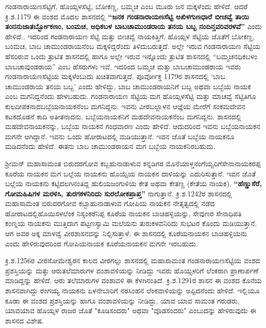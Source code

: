 ಗಂಡನಾರಾಯಣಸೆಟ್ಟಿಗೆ, ಹೊಯ್ಸಳಸೆಟ್ಟಿ, ಬೋಕಣ್ಣ, ಬಮ್ಮಚ ಎಂಬ ಮೂರು ಜನ ಮಕ್ಕಳೆಂದು ಹೇಳಿದೆ. ಆದರೆ ಕ್ರಿ.ಶ.1179 ಈ ವಂಶದ ಮೊದಲ ಶಾಸನದಲ್ಲಿ \textbf{“ಜನಕ ಗಂಡನಾರಾಯಣಸೆಟ್ಟಿ ಅಖಿಳಗುಣಧಾರೆ ಬೀಚವ್ವೆ ತಾಯಿ\general{\break } ತಂನನುಜಾತರ್ಬ್ಬೋಕಣಂ, ಬಂಮಚ, ಅಧಿಕಬಳ ಬಾಬಚಾಮುಂಡರಾಯ ತನಯ ಬಬ್ಬ ನಂದಿನ್ತವರಿವರಳವೆ” }ಎಂದು ಹೇಳಿದೆ.. ಇದರಿಂದ ಗಂಡನಾರಾಯಣ ಸೆಟ್ಟಿ ಮತ್ತು ಬೀಚವ್ವೆ ನಾಯಕಿತ್ತಿಗೆ, ಹೊಯ್ಸಳ ಸೆಟ್ಟಿಯ ಜೊತೆಗೆ ಬೋಕಣ್ಣ, ಬಂಮಚ, ಬಾಬ ಚಾಮುಂಡರಾಯನೆಂಬ ಮಕ್ಕಳಿದ್ದರೆಂದು ತಿಳಿದುಬರುತ್ತದೆ. ಅಲ್ಲೇ ಇರುವ ಗಂಡನಾರಾಯಣ ಸೆಟ್ಟಿಯ ಹೆಸರಿರುವ ಒಂದು ತ್ರುಟಿತ ಶಾಸನದಲ್ಲಿ ಹಾಗೂ ಅಲ್ಲೇ ಇರುವ ಇನ್ನೊಂದು ತ್ರುಟಿತ ಶಾಸನದಲ್ಲಿ “ಬಮ್ಮಚನಧಿಕಬಳಂ ಬಾಬಚಾವುಂಡರಾಯ” ಎಂಬ ಹೆಸರುಗಳು ಇವೆ. ಇದರಿಂದ ಬಮ್ಮಚ ಮತ್ತು ಬಾಬಚಾಮುಂಡರಾಯ ಇವರು ಗಂಡನಾರಾಯಣಸೆಟ್ಟಿಯ ಮಕ್ಕಳೆಂಬುದು ಖಚಿತವಾಗುತ್ತದೆ. ಪೂರ್ವೋಕ್ತ 1179ರ ಶಾಸನದಲ್ಲಿ ‘ಬಾಬ ಚಾಮುಂಡರಾಯ ತನಯ ಬಬ್ಬ’ ಎಂದು ಹೇಳಿದ್ದು, ಬಾಬ ಚಾಮುಂಡರಾಯನಿಗೆ ಬಬ್ಬ ಅಥವಾ ಬಬ್ಬೆಯ ನಾಯಕ ಎಂಬ ಮಗನಿದ್ದನೆಂದು ಹೇಳಬಹುದು. ಗಂಡನಾರಾಯಣ ಸೆಟ್ಟಿಯ ಮಗ ಹೊಯ್ಸಳಸೆಟ್ಟಿ ಮತ್ತು ಮಾಚವ್ವೆ ಸೆಟ್ಟಿತಿಗೂ ಕುಲದೀಪಕನಾದ\break ಬಬ್ಬೆಯನಾಯಕನೆಂಬ ಮಗನಿದ್ದನು. ಇವನು ವೀರಬಲ್ಲಾಳನ ಆಜ್ಞೆಯ ಮೇರೆಗೆ ಸಂಕಮದೇವನ ಕಟಕದೊಡನೆ ಕಾದಿ ಅತೀತನಾದನು. ಬಬ್ಬೆಯನಾಯಕನಿಗೆ ಮಹದೇವನಾಯಕನೆಂಬ ಮಗನಿದ್ದನು. ಶಾಸನದಲ್ಲಿ ಮಹದೇವನಾಯಕನನ್ನು, ಬಬ್ಬೆಯ ನಾಯಕನ ಗಂಧವಾರಣ ಎಂದು ಹೇಳಿದೆ. ಆದುದರಿಂದ ಇವನು ಬಬ್ಬೆಯನಾಯಕನ ಮಗನೇ ಆಗಿದ್ದಾನೆ. ಇವನು ಒಂದು ಹೋರಾಟದಲ್ಲಿ ಮಡಿಯುತ್ತಾನೆ. ಇವನ ಜೊತೆ ಬಬ್ಬೆಯ ನಾಯಕನೂ ಮಡಿದನೆಂದು ಹೇಳಿದೆ. ಈತನು ಬಾಬ ಚಾಮುಂಡರಾಯನ ಮಗ ಬಬ್ಬೆಯ ನಾಯಕನಿರಬಹುದು.

ಶ‍್ರೀಮನ್​ ಮಹಾಸಾಮಂತ ಬಿರುದರಗೋವ ಕಬ್ಬಹುನಾಡಾಳುವ ಕನ್ನಡಿಗರ ಮೊನೆಯಾಳ್ತನಂಗೆಯ್ವರಿಗೆ\break ಸೇನಾನಾಯಕರಪ್ಪ ಕೂರೆಯ ನಾಯಕನ ಮಗ ಬಲ್ಲೆಯ ನಾಯಕನು ಹೊಯ್ಸೆಯ ನಾಯಕನ ದಾಳಿಯನ್ನು ಎದುರಿಸುತ್ತಾನೆ. ಇವನ ಜೊತೆ ಬಲ್ಲೆಯ ನಾಯಕನು ಕಟ್ಟಿದಲಗಿನಂತಿದ್ದ ಹುಲಿಯಜಂಗುಳಿಯ ಕೇತ ಅಥವಾ ಕೇತಣ್ಣ (ಕೇತೆಯ ನಾಯಕ), \textbf{“ಹೆಣ್ಣುಸೆರೆ, ಗೋಮಹಿಷಿಗಳ ಮರಳಿಸಿ, ತುರಗಕಳನಿರಿದು ಸುರಲೋಕಪ್ರಾಪ್ತ”} ನಾಗುತ್ತಾನೆ. ಕ್ರಿ.ಶ.1242ರ ಶಾಸನದಲ್ಲಿ ಮಹಾಸಾಮಂತ ಬಿರುದರಗೋವ ಕಬ್ಬಾಹುನಾಡಾಳುವ ಗೋಪಿಯ ನಾಯಕನ ನೇತೃತ್ವದಲ್ಲಿ ನಡೆದ ಹೋರಾಟದಲ್ಲಿ\break ಹೊಯಿಸಳಲೆಂಕ ನಿಸ್ಸಂಕರೆನಿಪ್ಪ ಕೂರೆಯ ನಾಯಕನ ಬಾಚಿಹಳ್ಳಿಯನ್ನು, ಸೇವುಣರ ಸೇನಾಧಿಪತಿ ಕಂಣ್ನಯ ನಾಯಕನು ಮುತ್ತಿದಾಗ ಪಟ್ಟಣಸ್ವಾಮಿ ಮಲೆಯನು ತುರುಕಳವನಿರಿದು ಸುಭಟರ ಕೊಂದು ಮಡಿಯುತ್ತಾನೆ. ಆಗ ಅವರ ಅಕ್ಕ ಮಾಳವ್ವೆ ವೀರಶಾಸನವನ್ನು ನಿಲ್ಲಿಸುತ್ತಾಳೆ. ಈ ಶಾಸನದಲ್ಲಿ ಕೂರೆಯನಾಯಕನ ಬಾಚಿಹಳ್ಳಿಯನು ಎಂದು ಹೇಳಿರುವುದರಿಂದ ಗೋಪಿಯನಾಯಕ ಕೂರೆಯನಾಯಕನ ಮಗನೇ ಇರಬಹುದು.

ಕ್ರಿ.ಶ.1256ರ ವೀರಸೋಮೇಶ್ವರನ ಕಾಲದ ವೀರಗಲ್ಲು ಶಾಸನದಲ್ಲಿ ಮಹಾಸಾಮಂತ ಗಂಡನಾರಾಯಣಸೆಟ್ಟಿಯ ವಂಶದ ಪ್ರಶಸ್ತಿಯನ್ನು ಮತ್ತು ಆರುತಲೆಮಾರುಗಳ ವಂಶಾವಳಿಯನ್ನು ನೀಡಿದ್ದು ಇವರು ಹೊಯ್ಸಳರಿಗೆ ಲೆಂಕರಾಗಿ ಪ್ರಾಣಾರ್ಪಣೆ ಮಾಡಿದ್ದನ್ನು ಹೇಳಿದೆ. ಆರು ತಲೆಮಾರುಗಳ ವಂಶಾವಳಿ ಈ ಕೆಳಗಿನಂತಿದೆ. ಕ್ರಿ.ಶ.1291ರ ಶಾಸನ ಈ ವಂಶದ ಕೊನೆಯ ಶಾಸನವಾಗಿದ್ದು ರಂಗಯ್ಯ ನಾಯಕನು ಏಳನೇಬಾರಿಗೆ ನರಸಿಂಹನ ಲೆಂಕವಾಳಿಯನ್ನು ಅಪ್ಪಿದನೆಂದು ಹೇಳಿದೆ. ಇಲ್ಲಿಯೂ ಕೂಡಾ ಈ ವಂಶದ ಪ್ರಶಸ್ತಿಯನ್ನು ಹಾಗೂ ವಂಶಾವಳಿಯನ್ನು ನೀಡಿದ್ದು, ಯಾವ ಯಾವ ಸಾಮಂತ ಗರುಡರು, ಯಾವಯಾವ ಹೊಯ್ಸಳ ರಾಜರ ಜೊತೆ "ಕೂಡಿಸಂದರು" ಅಥವಾ "ವೊಡಸಂದರು" ಎಂಬುದನ್ನು ಹೇಳಿರುವುದು ಈ ಶಾಸನದ ವಿಶೇಷ.

